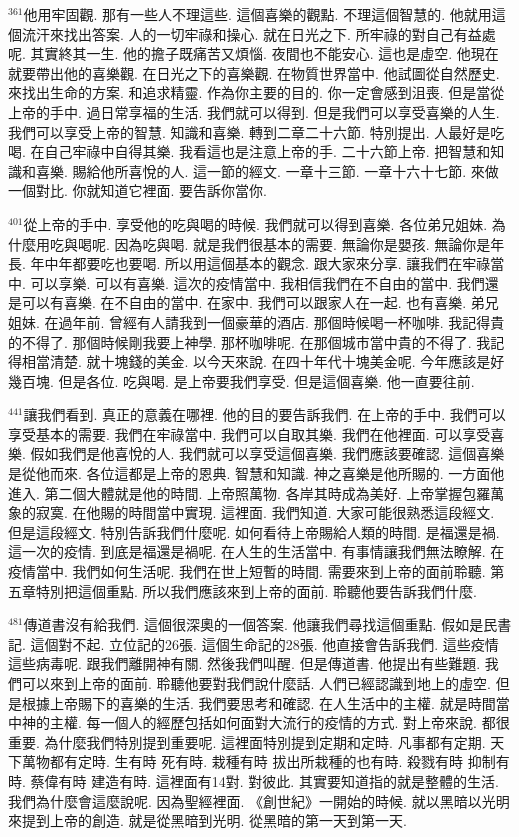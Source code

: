 \documentclass{book}
\begin{document}
$^{361}$他用牢固觀.
那有一些人不理這些.
這個喜樂的觀點.
不理這個智慧的.
他就用這個流汗來找出答案.
人的一切牢祿和操心.
就在日光之下.
所牢祿的對自己有益處呢.
其實終其一生.
他的擔子既痛苦又煩惱.
夜間也不能安心.
這也是虛空.
他現在就要帶出他的喜樂觀.
在日光之下的喜樂觀.
在物質世界當中.
他試圖從自然歷史.
來找出生命的方案.
和追求精靈.
作為你主要的目的.
你一定會感到沮喪.
但是當從上帝的手中.
過日常享福的生活.
我們就可以得到.
但是我們可以享受喜樂的人生.
我們可以享受上帝的智慧.
知識和喜樂.
轉到二章二十六節.
特別提出.
人最好是吃喝.
在自己牢祿中自得其樂.
我看這也是注意上帝的手.
二十六節上帝.
把智慧和知識和喜樂.
賜給他所喜悅的人.
這一節的經文.
一章十三節.
一章十六十七節.
來做一個對比.
你就知道它裡面.
要告訴你當你.

$^{401}$從上帝的手中.
享受他的吃與喝的時候.
我們就可以得到喜樂.
各位弟兄姐妹.
為什麼用吃與喝呢.
因為吃與喝.
就是我們很基本的需要.
無論你是嬰孩.
無論你是年長.
年中年都要吃也要喝.
所以用這個基本的觀念.
跟大家來分享.
讓我們在牢祿當中.
可以享樂.
可以有喜樂.
這次的疫情當中.
我相信我們在不自由的當中.
我們還是可以有喜樂.
在不自由的當中.
在家中.
我們可以跟家人在一起.
也有喜樂.
弟兄姐妹.
在過年前.
曾經有人請我到一個豪華的酒店.
那個時候喝一杯咖啡.
我記得貴的不得了.
那個時候剛我要上神學.
那杯咖啡呢.
在那個城市當中貴的不得了.
我記得相當清楚.
就十塊錢的美金.
以今天來說.
在四十年代十塊美金呢.
今年應該是好幾百塊.
但是各位.
吃與喝.
是上帝要我們享受.
但是這個喜樂.
他一直要往前.

$^{441}$讓我們看到.
真正的意義在哪裡.
他的目的要告訴我們.
在上帝的手中.
我們可以享受基本的需要.
我們在牢祿當中.
我們可以自取其樂.
我們在他裡面.
可以享受喜樂.
假如我們是他喜悅的人.
我們就可以享受這個喜樂.
我們應該要確認.
這個喜樂是從他而來.
各位這都是上帝的恩典.
智慧和知識.
神之喜樂是他所賜的.
一方面他進入.
第二個大體就是他的時間.
上帝照萬物.
各岸其時成為美好.
上帝掌握包羅萬象的寂寞.
在他賜的時間當中實現.
這裡面.
我們知道.
大家可能很熟悉這段經文.
但是這段經文.
特別告訴我們什麼呢.
如何看待上帝賜給人類的時間.
是福還是禍.
這一次的疫情.
到底是福還是禍呢.
在人生的生活當中.
有事情讓我們無法瞭解.
在疫情當中.
我們如何生活呢.
我們在世上短暫的時間.
需要來到上帝的面前聆聽.
第五章特別把這個重點.
所以我們應該來到上帝的面前.
聆聽他要告訴我們什麼.

$^{481}$傳道書沒有給我們.
這個很深奧的一個答案.
他讓我們尋找這個重點.
假如是民書記.
這個對不起.
立位記的26張.
這個生命記的28張.
他直接會告訴我們.
這些疫情這些病毒呢.
跟我們離開神有關.
然後我們叫醒.
但是傳道書.
他提出有些難題.
我們可以來到上帝的面前.
聆聽他要對我們說什麼話.
人們已經認識到地上的虛空.
但是根據上帝賜下的喜樂的生活.
我們要思考和確認.
在人生活中的主權.
就是時間當中神的主權.
每一個人的經歷包括如何面對大流行的疫情的方式.
對上帝來說.
都很重要.
為什麼我們特別提到重要呢.
這裡面特別提到定期和定時.
凡事都有定期.
天下萬物都有定時.
生有時 死有時.
栽種有時 拔出所栽種的也有時.
殺戮有時 抑制有時.
蔡偉有時 建造有時.
這裡面有14對.
對彼此.
其實要知道指的就是整體的生活.
我們為什麼會這麼說呢.
因為聖經裡面.
《創世紀》一開始的時候.
就以黑暗以光明來提到上帝的創造.
就是從黑暗到光明.
從黑暗的第一天到第一天.
\end{document}
